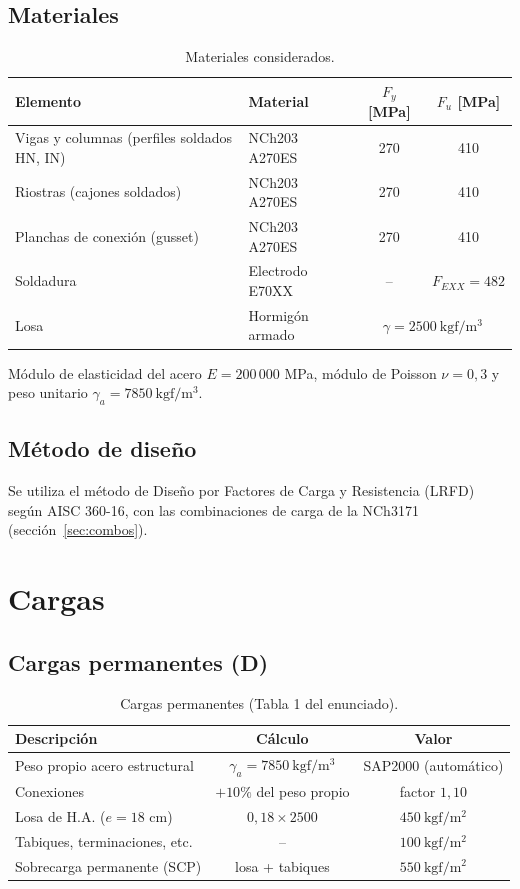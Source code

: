 \documentclass[11pt,letterpaper]{article}
\begin{document}
\subsection{Materiales}
\begin{table}[H]
\centering
\caption{Materiales considerados.}
\begin{tabular}{llcc}
\toprule
Elemento & Material & $F_y$ [MPa] & $F_u$ [MPa] \\
\midrule
Vigas y columnas (perfiles soldados HN, IN) & NCh203 A270ES & 270 & 410 \\
Riostras (cajones soldados) & NCh203 A270ES & 270 & 410 \\
Planchas de conexión (gusset) & NCh203 A270ES & 270 & 410 \\
Soldadura & Electrodo E70XX & -- & $F_{EXX} = 482$ \\
Losa & Hormigón armado & \multicolumn{2}{c}{$\gamma = 2500\ \mathrm{kgf/m^3}$} \\
\bottomrule
\end{tabular}
\end{table}
Módulo de elasticidad del acero $E = 200\,000$ MPa, módulo de Poisson $\nu = 0{,}3$ y
peso unitario $\gamma_a = 7850\ \mathrm{kgf/m^3}$.

\subsection{Método de diseño}
Se utiliza el método de Diseño por Factores de Carga y Resistencia (LRFD) según AISC 360-16, con las
combinaciones de carga de la NCh3171 (sección~\ref{sec:combos}).

\section{Cargas}

\subsection{Cargas permanentes (D)}
\begin{table}[H]
\centering
\caption{Cargas permanentes (Tabla 1 del enunciado).}
\begin{tabular}{lcc}
\toprule
Descripción & Cálculo & Valor \\
\midrule
Peso propio acero estructural & $\gamma_a = 7850\ \mathrm{kgf/m^3}$ & SAP2000 (automático) \\
Conexiones & $+10\%$ del peso propio & factor $1{,}10$ \\
Losa de H.A. ($e = 18$ cm) & $0{,}18 \times 2500$ & $450\ \mathrm{kgf/m^2}$ \\
Tabiques, terminaciones, etc. & -- & $100\ \mathrm{kgf/m^2}$ \\
\midrule
Sobrecarga permanente (SCP) & losa + tabiques & $550\ \mathrm{kgf/m^2}$ \\
\bottomrule
\end{tabular}
\end{table}
\end{document}
